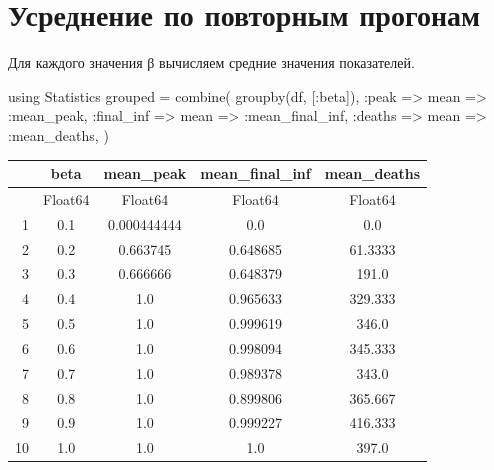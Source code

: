\documentclass[
  12pt,
  a4paper,
  DIV=11,
  numbers=noendperiod]{scrreprt}
\newenvironment{Shaded}{\begin{snugshade}}{\end{snugshade}}
\newcommand{\BuiltInTok}[1]{\textcolor[rgb]{0.00,0.23,0.31}{#1}}
\newcommand{\FunctionTok}[1]{\textcolor[rgb]{0.28,0.35,0.67}{#1}}
\newcommand{\ImportTok}[1]{\textcolor[rgb]{0.00,0.46,0.62}{#1}}
\newcommand{\NormalTok}[1]{\textcolor[rgb]{0.00,0.23,0.31}{#1}}
\newcommand{\OperatorTok}[1]{\textcolor[rgb]{0.37,0.37,0.37}{#1}}
\begin{document}
\section{Усреднение по повторным
прогонам}\label{ux443ux441ux440ux435ux434ux43dux435ux43dux438ux435-ux43fux43e-ux43fux43eux432ux442ux43eux440ux43dux44bux43c-ux43fux440ux43eux433ux43eux43dux430ux43c}

Для каждого значения β вычисляем средние значения показателей.

\begin{Shaded}
\begin{Highlighting}[]
\ImportTok{using} \BuiltInTok{Statistics}
\NormalTok{grouped }\OperatorTok{=} \FunctionTok{combine}\NormalTok{(}
    \FunctionTok{groupby}\NormalTok{(df, [}\OperatorTok{:}\NormalTok{beta]),}
    \OperatorTok{:}\NormalTok{peak }\OperatorTok{=\textgreater{}}\NormalTok{ mean }\OperatorTok{=\textgreater{}} \OperatorTok{:}\NormalTok{mean\_peak,}
    \OperatorTok{:}\NormalTok{final\_inf }\OperatorTok{=\textgreater{}}\NormalTok{ mean }\OperatorTok{=\textgreater{}} \OperatorTok{:}\NormalTok{mean\_final\_inf,}
    \OperatorTok{:}\NormalTok{deaths }\OperatorTok{=\textgreater{}}\NormalTok{ mean }\OperatorTok{=\textgreater{}} \OperatorTok{:}\NormalTok{mean\_deaths,}
\NormalTok{)}
\end{Highlighting}
\end{Shaded}

\begin{tabular}{r|cccc}
    & beta & mean\_peak & mean\_final\_inf & mean\_deaths\\
    \hline
    & Float64 & Float64 & Float64 & Float64\\
    \hline
    1 & 0.1 & 0.000444444 & 0.0 & 0.0 \\
    2 & 0.2 & 0.663745 & 0.648685 & 61.3333 \\
    3 & 0.3 & 0.666666 & 0.648379 & 191.0 \\
    4 & 0.4 & 1.0 & 0.965633 & 329.333 \\
    5 & 0.5 & 1.0 & 0.999619 & 346.0 \\
    6 & 0.6 & 1.0 & 0.998094 & 345.333 \\
    7 & 0.7 & 1.0 & 0.989378 & 343.0 \\
    8 & 0.8 & 1.0 & 0.899806 & 365.667 \\
    9 & 0.9 & 1.0 & 0.999227 & 416.333 \\
    10 & 1.0 & 1.0 & 1.0 & 397.0 \\
\end{tabular}
\end{document}
